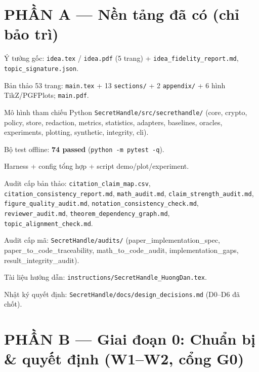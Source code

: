 \documentclass[11pt,a4paper]{article}
\newcommand{\done}{\textcolor{shgreen}{$\blacksquare$}}
\newcommand{\code}[1]{\texttt{\small #1}}
\begin{document}
\section*{PHẦN A --- Nền tảng đã có (chỉ bảo trì)}
\begin{chk}
\item[\done] Ý tưởng gốc: \code{idea.tex} / \code{idea.pdf} (5 trang) + \code{idea\_fidelity\_report.md}, \code{topic\_signature.json}.
\item[\done] Bản thảo 53 trang: \code{main.tex} + 13 \code{sections/} + 2 \code{appendix/} + 6 hình TikZ/PGFPlots; \code{main.pdf}.
\item[\done] Mô hình tham chiếu Python \code{SecretHandle/src/secrethandle/} (core, crypto, policy, store, redaction, metrics, statistics, adapters, baselines, oracles, experiments, plotting, synthetic, integrity, cli).
\item[\done] Bộ test offline: \textbf{74 passed} (\code{python -m pytest -q}).
\item[\done] Harness + config tổng hợp + script demo/plot/experiment.
\item[\done] Audit cấp bản thảo: \code{citation\_claim\_map.csv}, \code{citation\_consistency\_report.md}, \code{math\_audit.md}, \code{claim\_strength\_audit.md}, \code{figure\_quality\_audit.md}, \code{notation\_consistency\_check.md}, \code{reviewer\_audit.md}, \code{theorem\_dependency\_graph.md}, \code{topic\_alignment\_check.md}.
\item[\done] Audit cấp mã: \code{SecretHandle/audits/} (paper\_implementation\_spec, paper\_to\_code\_traceability, math\_to\_code\_audit, implementation\_gaps, result\_integrity\_audit).
\item[\done] Tài liệu hướng dẫn: \code{instructions/SecretHandle\_HuongDan.tex}.
\item[\done] Nhật ký quyết định: \code{SecretHandle/docs/design\_decisions.md} (D0--D6 đã chốt).
\end{chk}

\section*{PHẦN B --- Giai đoạn 0: Chuẩn bị \& quyết định (W1--W2, cổng G0)}
\end{document}

